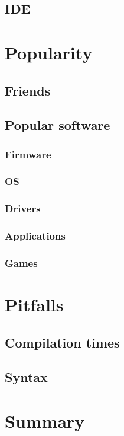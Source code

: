 \documentclass[%
final,
xcolor = table,
usenames,
dvipsnames,
table,
aspectratio = 169]{beamer}
\begin{document}
\subsection{IDE}


\section{Popularity}

\subsection{Friends}

\subsection{Popular software}

\subsubsection{Firmware}

\subsubsection{OS}

\subsubsection{Drivers}

\subsubsection{Applications}


\subsubsection{Games}


\section{Pitfalls}
\subsection{Compilation times}
\subsection{Syntax}


\section{Summary}


\appendix


\end{document}
